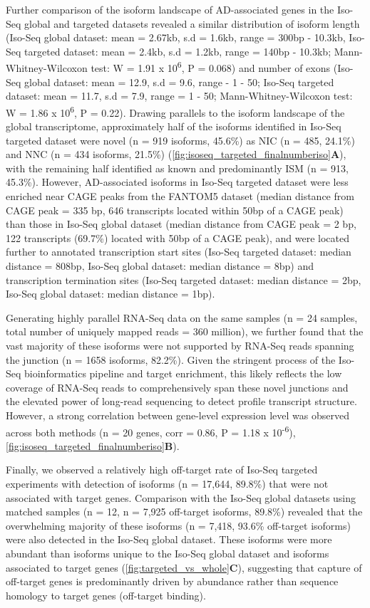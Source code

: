 Further comparison of the isoform landscape of AD-associated genes in the Iso-Seq global and targeted datasets revealed a similar distribution of isoform length (Iso-Seq global dataset: mean = 2.67kb, s.d = 1.6kb, range = 300bp - 10.3kb, Iso-Seq targeted dataset: mean = 2.4kb, s.d = 1.2kb, range = 140bp - 10.3kb; Mann-Whitney-Wilcoxon test: W = 1.91 x 10\textsuperscript{6}, P = 0.068) and number of exons (Iso-Seq global dataset: mean = 12.9, s.d = 9.6, range - 1 - 50; Iso-Seq targeted dataset: mean = 11.7, s.d = 7.9, range = 1 - 50; Mann-Whitney-Wilcoxon test: W = 1.86 x 10\textsuperscript{6}, P = 0.22). Drawing parallels to the isoform landscape of the global transcriptome, approximately half of the isoforms identified in Iso-Seq targeted dataset were novel (n = 919 isoforms, 45.6\%) as NIC (n = 485, 24.1\%) and NNC (n = 434 isoforms, 21.5\%) (\cref{fig:isoseq_targeted_finalnumberiso}\textbf{A}), with the remaining half identified as known and predominantly ISM (n = 913, 45.3\%). However, AD-associated isoforms in Iso-Seq targeted dataset were less enriched near CAGE peaks from the FANTOM5 dataset (median distance from CAGE peak = 335 bp, 646 transcripts located within 50bp of a CAGE peak) than those in Iso-Seq global dataset (median distance from CAGE peak = 2 bp, 122 transcripts (69.7\%) located with 50bp of a CAGE peak), and were located further to annotated transcription start sites (Iso-Seq targeted dataset: median distance = 808bp, Iso-Seq global dataset: median distance = 8bp) and transcription termination sites (Iso-Seq targeted dataset: median distance = 2bp, Iso-Seq global dataset: median distance = 1bp). 

Generating highly parallel RNA-Seq data on the same samples (n = 24 samples, total number of uniquely mapped reads = 360 million), we further found that the vast majority of these isoforms were not supported by RNA-Seq reads spanning the junction (n = 1658 isoforms, 82.2\%). Given the stringent process of the Iso-Seq bioinformatics pipeline and target enrichment, this likely reflects the low coverage of RNA-Seq reads to comprehensively span these novel junctions and the elevated power of long-read sequencing to detect profile transcript structure. However, a strong correlation between gene-level expression level was observed across both methods (n = 20 genes, corr = 0.86, P = 1.18 x 10\textsuperscript{-6}), \cref{fig:isoseq_targeted_finalnumberiso}\textbf{B}). 

Finally, we observed a relatively high off-target rate of Iso-Seq targeted experiments with detection of isoforms (n = 17,644, 89.8\%) that were not associated with target genes. Comparison with the Iso-Seq global datasets using matched samples (n = 12, n = 7,925 off-target isoforms, 89.8\%) revealed that the overwhelming majority of these isoforms (n = 7,418, 93.6\% off-target isoforms) were also detected in the Iso-Seq global dataset. These isoforms were more abundant than isoforms unique to the Iso-Seq global dataset and isoforms associated to target genes (\cref{fig:targeted_vs_whole}\textbf{C}), suggesting that capture of off-target genes is predominantly driven by abundance rather than sequence homology to target genes (off-target binding).  

